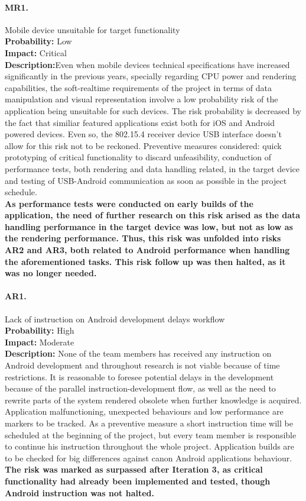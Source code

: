 		\paragraph{MR1.}Mobile device unsuitable for target functionality\\
		\textbf{Probability:} Low\\
		\textbf{Impact:} Critical\\
		\textbf{Description:}Even when mobile devices technical specifications have increased significantly in the previous years, specially regarding CPU power and rendering capabilities, the soft-realtime requirements of the project in terms of data manipulation and visual representation involve a low probability risk of the application being unsuitable for such devices. The risk probability is decreased by the fact that similiar featured applications exist both for iOS and Android powered devices. Even so, the 802.15.4 receiver device USB interface doesn't allow for this risk not to be reckoned.
		Preventive measures considered: quick prototyping of critical functionality to discard  unfeasibility, conduction of performance tests, both rendering and data handling related, in the target device and testing of USB-Android communication as soon as possible in the project schedule.\\
		\textbf{As performance tests were conducted on early builds of the application, the need of further research on this risk arised as the data handling performance in the target device was low, but not as low as the rendering performance. Thus, this risk was unfolded into risks AR2 and AR3, both related to Android performance when handling the aforementioned tasks. This risk follow up was then halted, as it was no longer needed.}

		\paragraph{AR1.}Lack of instruction on Android development delays workflow\\
		\textbf{Probability:} High\\
		\textbf{Impact:} Moderate\\
		\textbf{Description:} None of the team members has received any instruction on Android development and throughout research is not viable because of time restrictions. It is reasonable to foresee potential delays in the development because of the parallel instruction-development flow, as well as the need to rewrite parts of the system rendered obsolete when further knowledge is acquired.
		Application malfunctioning, unexpected behaviours and low performance are markers to be tracked.
		As a preventive measure a short instruction time will be scheduled at the beginning of the project, but every team member is responsible to continue his instruction throughout the whole project. Application builds are to be checked for big differences against canon Android applications behaviour.\\
		\textbf{The risk was marked as surpassed after Iteration 3, as critical functionality had already been implemented and tested, though Android instruction was not halted.}

